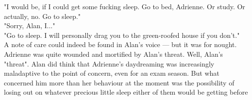 "I would be, if I could get some fucking sleep. Go to bed, Adrienne. Or study. Or actually, no. Go to sleep."\\

"Sorry, Alan, I..."\\

"Go to sleep. I will personally drag you to the green-roofed house if you don't."\\

A note of care could indeed be found in Alan's voice --- but it was for nought. Adrienne was quite wounded and mortified by Alan's threat.
Well, Alan's "threat". Alan did think that Adrienne's daydreaming was increasingly maladaptive to the point of concern, even for an exam season.
But what concerned him more than her behaviour at the moment was the possibility of losing out on whatever precious little sleep either of them would be getting before  